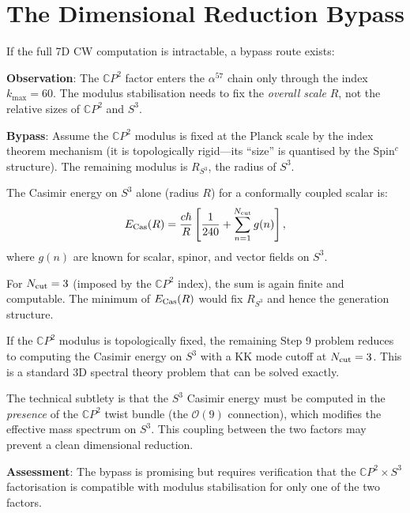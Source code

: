 \documentclass[11pt,a4paper]{article}
\newcommand{\CP}{\mathbb{C}P}
\newcounter{findingctr}
\newenvironment{finding}[1][]{%
  \refstepcounter{findingctr}%
  \begin{tcolorbox}[colback=blue!3!white, colframe=blue!50!black,
    title=\textbf{Finding \thefindingctr: #1}]
}{%
  \end{tcolorbox}%
}
\begin{document}
\section{The Dimensional Reduction Bypass}
\label{sec:bypass}

If the full 7D CW computation is intractable, a bypass route exists:

\textbf{Observation}: The $\CP^2$ factor enters the $\alpha^{57}$
chain only through the index $k_{\max} = 60$. The modulus
stabilisation needs to fix the \emph{overall scale} $R$, not the
relative sizes of $\CP^2$ and $S^3$.

\textbf{Bypass}: Assume the $\CP^2$ modulus is fixed at the
Planck scale by the index theorem mechanism (it is topologically
rigid---its ``size'' is quantised by the Spin$^c$ structure). The
remaining modulus is $R_{S^3}$, the radius of $S^3$.

The Casimir energy on $S^3$ alone (radius $R$) for a conformally
coupled scalar is:
\begin{equation}
E_{\rm Cas}(R) = \frac{c\hbar}{R}\left[\frac{1}{240}
+ \sum_{n=1}^{N_{\rm cut}} g(n)\right],
\end{equation}
where $g(n)$ are known for scalar, spinor, and vector fields on $S^3$.

For $N_{\rm cut} = 3$ (imposed by the $\CP^2$ index), the sum is
again finite and computable. The minimum of $E_{\rm Cas}(R)$ would
fix $R_{S^3}$ and hence the generation structure.

\begin{finding}[Dimensional Reduction Reduces Problem to 3D Spectral Theory]
\label{find:bypass}
If the $\CP^2$ modulus is topologically fixed, the remaining Step 9
problem reduces to computing the Casimir energy on $S^3$ with a
KK mode cutoff at $N_{\rm cut} = 3$. This is a standard 3D spectral
theory problem that can be solved exactly.

The technical subtlety is that the $S^3$ Casimir energy must be
computed in the \emph{presence} of the $\CP^2$ twist bundle (the
$\mathcal{O}(9)$ connection), which modifies the effective mass
spectrum on $S^3$. This coupling between the two factors may
prevent a clean dimensional reduction.

\textbf{Assessment}: The bypass is promising but requires verification
that the $\CP^2 \times S^3$ factorisation is compatible with modulus
stabilisation for only one of the two factors.
\end{finding}
\end{document}
